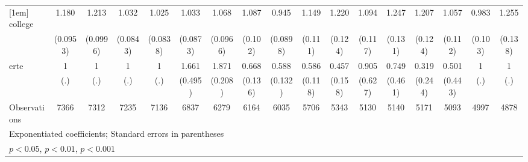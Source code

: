 {\begin{tabular}{l*{16}{c}}
[1em]
college             &       1.180\sym{*}  &       1.213\sym{*}  &       1.032         &       1.025         &       1.033         &       1.068         &       1.087         &       0.945         &       1.149         &       1.220\sym{*}  &       1.094         &       1.247\sym{*}  &       1.207         &       1.057         &       0.983         &       1.255\sym{*}  \\
                    &    (0.0953)         &    (0.0996)         &    (0.0843)         &    (0.0838)         &    (0.0873)         &    (0.0966)         &     (0.102)         &    (0.0898)         &     (0.111)         &     (0.124)         &     (0.117)         &     (0.131)         &     (0.124)         &     (0.112)         &     (0.103)         &     (0.138)         \\
[1em]
erte                &           1         &           1         &           1         &           1         &       1.661         &       1.871\sym{***}&       0.668\sym{*}  &       0.588\sym{*}  &       0.586\sym{**} &       0.457\sym{*}  &       0.905         &       0.749         &       0.319         &       0.501         &           1         &           1         \\
                    &         (.)         &         (.)         &         (.)         &         (.)         &     (0.495)         &     (0.208)         &     (0.136)         &     (0.132)         &     (0.118)         &     (0.158)         &     (0.627)         &     (0.461)         &     (0.244)         &     (0.443)         &         (.)         &         (.)         \\
\hline
Observations        &        7366         &        7312         &        7235         &        7136         &        6837         &        6279         &        6164         &        6035         &        5706         &        5343         &        5130         &        5140         &        5171         &        5093         &        4997         &        4878         \\
\hline\hline
\multicolumn{17}{l}{\footnotesize Exponentiated coefficients; Standard errors in parentheses}\\
\multicolumn{17}{l}{\footnotesize \sym{*} \(p<0.05\), \sym{**} \(p<0.01\), \sym{***} \(p<0.001\)}\\
\end{tabular}
}
